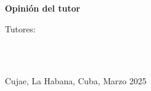 
{\Large \textbf{Opinión del tutor} \vspace{.3cm}}


Tutores:

\renewcommand{\arraystretch}{0.3} %
\begin{tabular}{l c}
\end{tabular}\\
\begin{center}
Cujae, La Habana, Cuba, Marzo 2025
\end{center}

\renewcommand{\arraystretch}{1} %
\restoregeometry
